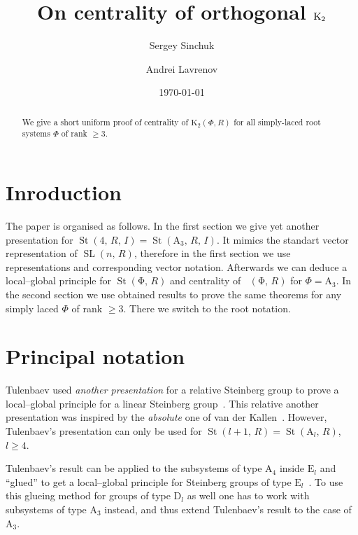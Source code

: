 \documentclass[11pt]{amsart}
\title{On centrality of orthogonal $\Kt$}
\author{Sergey Sinchuk}
\author {Andrei Lavrenov}
\date {\today}
\theoremstyle{plain} \declaretheorem[name=Theorem, Refname={Theorem,Theorems}]{tm} \Crefname{tm}{Theorem}{Theorems}
\numberwithin{equation}{section}
\theoremstyle{definition} \newtheorem{df}[lm]{Definition} \Crefname{df}{Definition}{Definitions}
\theoremstyle{remark} \newtheorem{rk}[lm]{Remark} \Crefname{rk}{Remark}{Remarks}
\newcommand{\St}{\mathop{\mathrm{St}}\nolimits}
\newcommand{\SL}{\mathop{\mathrm{SL}}\nolimits}
\newcommand{\Kt}{\mathop{\mathrm{K_2}}\nolimits}
\begin{document}
\begin{abstract} We give a short uniform proof of centrality of $\mathrm K_2(\Phi, R)$ for all simply-laced root systems $\Phi$ of rank $\geq 3$.
\end{abstract}

\maketitle


\section*{Inroduction}

The paper is organised as follows. In the first section we give yet another presentation for $\St(4,\,R,\,I)=\St(\mathrm A_3,\,R,\,I)$.
It mimics the standart vector representation of $\SL(n,\,R)$, therefore in the first section we use representations and corresponding vector notation. 
Afterwards we can deduce a local--global principle for $\St(\mathrm\Phi,\,R)$ and centrality of $\Kt(\mathrm\Phi,\,R)$ for $\Phi=\mathrm A_3$. 
In the second section we use obtained results to prove the same theorems for any simply laced $\Phi$ of rank $\geq3$. There we switch to the root notation.

\section{Principal notation}

Tulenbaev used {\it another presentation} for a relative Steinberg group to prove a local--global principle for a linear Steinberg group~\cite{Tul}. 
This relative another presentation was inspired by the {\it absolute} one of van der Kallen~\cite{vdK}. 
However, Tulenbaev's presentation can only be used for $\St(l+1,\,R)=\St(\mathrm A_l,\,R)$, $l\geq4$.

Tulenbaev's result can be applied to the subsystems of type $\mathrm A_4$ inside $\mathrm E_l$ and ``glued'' to get a local--global principle for Steinberg groups of type $\mathrm E_l$~\cite{SCh}. 
To use this glueing method for groups of type $\mathrm D_l$ as well one has to work with subsystems of type $\mathrm A_3$ instead, and thus extend Tulenbaev's result to the case of $\mathrm A_3$.
\end{document}

